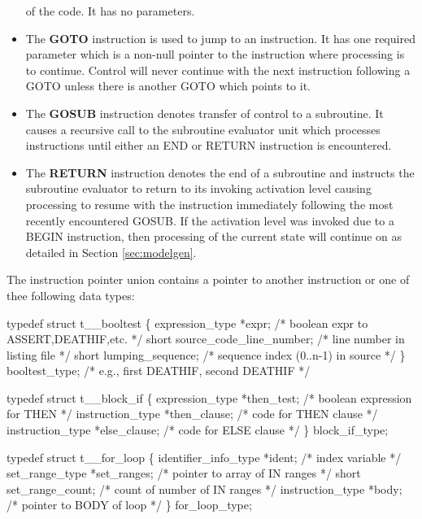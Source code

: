 \begin{itemize}
      of the code.   It has no parameters.
\item The {\bf GOTO} instruction is used to jump to an instruction.  It has
      one required parameter which is a non-null pointer to the instruction
      where processing is to continue.   Control will never continue with
      the next instruction following a GOTO unless there is another GOTO
      which points to it.
\item The {\bf GOSUB} instruction denotes transfer of control to a subroutine.
      It causes a recursive call to the subroutine evaluator unit which
      processes instructions until either an END or RETURN instruction is
      encountered.
\item The {\bf RETURN} instruction denotes the end of a subroutine and
      instructs the subroutine evaluator to return to its invoking activation
      level causing processing to resume with the instruction immediately
      following the most recently encountered GOSUB.   If the activation
      level was invoked due to a BEGIN instruction, then processing of the
      current state will continue on as detailed in Section \ref{sec:modelgen}.
\end{itemize}

The instruction pointer union contains a pointer to another instruction
or one of thee following data types:
\begin{codeexample}
typedef struct t__booltest
   \{
       expression_type *expr;         /* boolean expr to ASSERT,DEATHIF,etc. */
       short source_code_line_number; /* line number in listing file */
       short lumping_sequence;        /* sequence index (0..n-1) in source */
   \} booltest_type;                   /* e.g., first DEATHIF, second DEATHIF */
\end{codeexample}

\begin{codeexample}
typedef struct t__block_if
   \{
       expression_type *then_test;    /* boolean expression for THEN */
       instruction_type *then_clause; /* code for THEN clause */
       instruction_type *else_clause; /* code for ELSE clause */
   \} block_if_type;
\end{codeexample}

\begin{codeexample}
typedef struct t__for_loop
   \{
       identifier_info_type *ident;  /* index variable */
       set_range_type *set_ranges;   /* pointer to array of IN ranges */
       short set_range_count;        /* count of number of IN ranges */
       instruction_type *body;       /* pointer to BODY of loop */
   \} for_loop_type;
\end{codeexample}

